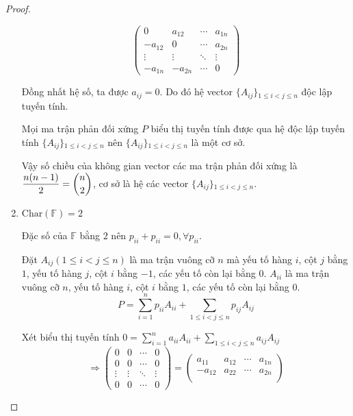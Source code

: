 \documentclass[class=linearalgebra,crop=false]{standalone}
\begin{document}
\begin{proof}
\begin{enumerate}
\[\begin{pmatrix}
                      0       & a_{12}  & \cdots & a_{1n} \\
                      -a_{12} & 0       & \cdots & a_{2n} \\
                      \vdots  & \vdots  & \ddots & \vdots \\
                      -a_{1n} & -a_{2n} & \cdots & 0
                  \end{pmatrix}
              \]
              \par Đồng nhất hệ số, ta được $a_{ij} = 0$. Do đó hệ vector $\{ A_{ij} \}{}_{1\le i < j \le n}$ độc lập tuyến tính.
              \par Mọi ma trận phản đối xứng $P$ biểu thị tuyến tính được qua hệ độc lập tuyến tính $\{ A_{ij} \}{}_{1\le i < j \le n}$ nên $\{ A_{ij} \}{}_{1\le i < j \le n}$ là một cơ sở.
              \par Vậy số chiều của không gian vector các ma trận phản đối xứng là $\dfrac{n(n-1)}{2} = \dbinom{n}{2}$, cơ sở là hệ các vector $\{ A_{ij} \}{}_{1\le i < j \le n}$.
        \item $\text{Char}(\mathbb{F}) = 2$
              \par Đặc số của $\mathbb{F}$ bằng $2$ nên $p_{ii} + p_{ii} = 0, \forall p_{ii}$.
              \par Đặt $A_{ij} (1\le i < j\le n)$ là ma trận vuông cỡ $n$ mà yếu tố hàng $i$, cột $j$ bằng $1$, yếu tố hàng $j$, cột $i$ bằng $-1$, các yếu tố còn lại bằng $0$. $A_{ii}$ là ma trận vuông cỡ $n$, yếu tố hàng $i$, cột $i$ bằng $1$, các yếu tố còn lại bằng $0$.
              \[ P = \sum^{n}_{i=1}p_{ii}A_{ii} + \sum_{1\le i < j \le n}p_{ij}A_{ij} \]
              \par Xét biểu thị tuyến tính $0 = \sum^{n}_{i=1}a_{ii}A_{ii} + \sum_{1\le i < j \le n}a_{ij}A_{ij}$
              \[
                  \Rightarrow
                  \begin{pmatrix}
                      0      & 0      & \cdots & 0      \\
                      0      & 0      & \cdots & 0      \\
                      \vdots & \vdots & \ddots & \vdots \\
                      0      & 0      & \cdots & 0
                  \end{pmatrix} =
                  \begin{pmatrix}
                      a_{11}  & a_{12}  & \cdots & a_{1n} \\
                      -a_{12} & a_{22}  & \cdots & a_{2n} \\

\end{pmatrix}\]
\end{enumerate}
\end{proof}
\end{document}
